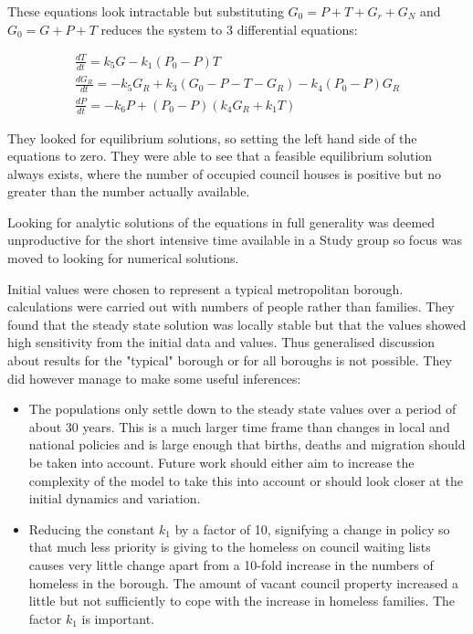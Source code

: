 \documentclass[11pt]{article} %
\begin{document}
These equations look intractable but substituting $ G_0=P+T+G_r+G_N $ and $ G_0=G+P+T$ reduces the system to 3 differential equations:

\begin{eqnarray}
\frac{dT}{dt}=k_5 G -k_1(P_0 -P)T\\
\frac{dG_R}{dt}=-k_5 G_R+k_3(G_0-P-T-G_R)-k_4(P_0-P)G_R\\
\frac{dP}{dt}=-k_6P+(P_0-P)(k_4G_R+k_1T)
\end{eqnarray}
	
	They looked for equilibrium solutions, so setting the left hand side of the equations to zero. They were able to see that a feasible equilibrium solution always exists, where the number of occupied council houses is positive but no greater than the number actually available. 
	
	Looking for analytic solutions of the equations in full generality was deemed unproductive for the short intensive time available in a Study group so focus was moved to looking for numerical solutions. 
	
	Initial values were chosen to represent a typical metropolitan borough. calculations were carried out with numbers of people rather than families. They found that the steady state solution was locally stable but that the values showed high sensitivity from the initial data and values. Thus generalised discussion about results for the "typical" borough or for all boroughs is not possible. They did however manage to make some useful inferences: 
	

	\begin{itemize}
		\item The populations only settle down to the steady state values over a period of about 30 years. This is a much larger time frame than changes in local and national policies and is large enough that births, deaths and migration should be taken into account. Future work should either aim to increase the complexity of the model to take this into account or should look closer at the initial dynamics and variation. 
		\item Reducing the constant $ k_1 $ by a factor of 10, signifying a change in policy so that much less priority is giving to the homeless on council waiting lists causes very little change apart from a 10-fold increase in the numbers of homeless in the borough. The amount of vacant council property increased a little but not sufficiently to cope with the increase in homeless families. The factor $ k_1 $ is important. 
	\end{itemize}
	
\end{document}
